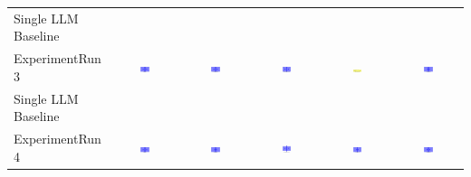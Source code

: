 \begin{table}
\begin{tabular}{@{}lccccc@{}}
    Single LLM Baseline \\
    ExperimentRun 3 & \includegraphics[width=0.15\textwidth]{./run_3/png/gpt-4o_results/BasicLayout.png} & \includegraphics[width=0.15\textwidth]{./run_3/png/o1-preview_results/BasicLayout.png} & \includegraphics[width=0.15\textwidth]{./run_3/png/claude-3-5-sonnet-20240620_results/BasicLayout.png} & \includegraphics[width=0.15\textwidth]{./run_3/png/watsonx_meta-llama_llama-3-1-70b-instruct_results/BasicLayout.png} & \includegraphics[width=0.15\textwidth]{./run_3/png/watsonx_meta-llama_llama-3-405b-instruct_results/BasicLayout.png} \\
    Single LLM Baseline \\
    ExperimentRun 4 & \includegraphics[width=0.15\textwidth]{./run_4/png/gpt-4o_results/BasicLayout.png} & \includegraphics[width=0.15\textwidth]{./run_4/png/o1-preview_results/BasicLayout.png} & \includegraphics[width=0.15\textwidth]{./run_4/png/claude-3-5-sonnet-20240620_results/BasicLayout.png} & \includegraphics[width=0.15\textwidth]{./run_4/png/watsonx_meta-llama_llama-3-1-70b-instruct_results/BasicLayout.png} & \includegraphics[width=0.15\textwidth]{./run_4/png/watsonx_meta-llama_llama-3-405b-instruct_results/BasicLayout.png} \\

\end{tabular}
\end{table}
